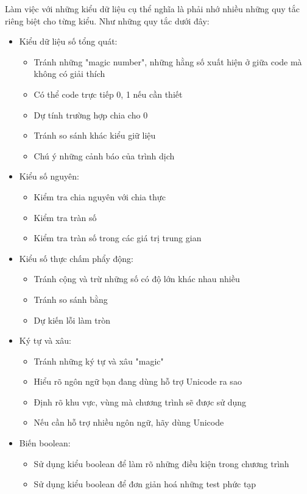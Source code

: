 \documentclass[12pt]{report}
\begin{document}
	Làm việc với những kiểu dữ liệu cụ thể nghĩa là phải nhớ nhiều những quy tắc riêng biệt cho từng kiểu. Như những quy tắc dưới đây:
\begin{itemize}
	\item Kiểu dữ liệu số tổng quát:
		\begin{itemize}
			\item Tránh những "magic number", những hằng số xuất hiện ở giữa code mà không có giải thích
			\item Có thể code trực tiếp 0, 1 nếu cần thiết
			\item Dự tính trường hợp chia cho 0
			\item Tránh so sánh khác kiểu giữ liệu 
			\item Chú ý những cảnh báo của trình dịch 
		\end{itemize}
	\item Kiểu số nguyên:
		\begin{itemize}
			\item Kiểm tra chia nguyên với chia thực 
			\item Kiểm tra tràn số
			\item Kiểm tra tràn số trong các giá trị trung gian
		\end{itemize}
	\item Kiểu số thực chấm phẩy động:
		\begin{itemize}
			\item Tránh cộng và trừ những số có độ lớn khác nhau nhiều
			\item Tránh so sánh bằng 
			\item Dự kiến lỗi làm tròn 
		\end{itemize}
	\item Ký tự và xâu:
		\begin{itemize}
			\item Tránh những ký tự và xâu "magic"
			\item Hiểu rõ ngôn ngữ bạn đang dùng hỗ trợ Unicode ra sao 
			\item Định rõ khu vực, vùng mà chương trình sẽ được sử dụng
			\item Nếu cần hỗ trợ nhiều ngôn ngữ, hãy dùng Unicode 
		\end{itemize}
	\item Biến boolean:
		\begin{itemize}
			\item Sử dụng kiểu boolean để làm rõ những điều kiện trong chương trình 
			\item Sử dụng kiểu boolean để đơn giản hoá những test phức tạp

\end{itemize}
\end{itemize}
\end{document}
